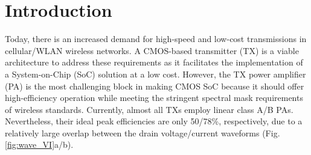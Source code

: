 \documentclass[conference]{IEEEtran}
\begin{document}
\section{Introduction}
Today, there is an increased demand for high-speed and low-cost transmissions in cellular/WLAN wireless networks. A CMOS-based transmitter (TX) is a viable architecture to address these requirements as it facilitates the implementation of a System-on-Chip (SoC) solution at a low cost. However, the TX power amplifier (PA) is the most challenging block in making CMOS SoC because it should offer high-efficiency operation while meeting the stringent spectral mask requirements of wireless standards. Currently, almost all TXs employ linear class A/B PAs. Nevertheless, their ideal  peak efficiencies are only 50/78\%, respectively, due to a relatively large overlap between the drain voltage/current  waveforms (Fig. \ref{fig:wave_VI}a/b).
\end{document}
